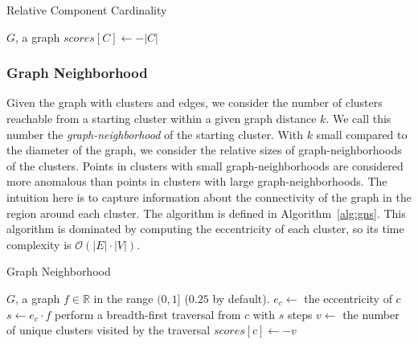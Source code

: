 \begin{algorithm}[h]
    \caption{Relative Component Cardinality}
    \label{alg:rcc}
\begin{algorithmic}[1]
    \REQUIRE $G$, a graph
        \STATE $scores[C] \gets -|C|$
    \ENDFOR
\end{algorithmic}
\end{algorithm}

\subsubsection{Graph Neighborhood}
Given the graph with clusters and edges, we consider the number of clusters reachable from a starting cluster within a given graph distance $k$.
We call this number the \textit{graph-neighborhood} of the starting cluster.
With $k$ small compared to the diameter of the graph, we consider the relative sizes of graph-neighborhoods of the clusters.
Points in clusters with small graph-neighborhoods are considered more anomalous than points in clusters with large graph-neighborhoods.
The intuition here is to capture information about the connectivity of the graph in the region around each cluster.
The algorithm is defined in Algorithm~\ref{alg:gns}.
This algorithm is dominated by computing the eccentricity of each cluster, so its time complexity is $\mathcal{O}(|E| \cdot |V|)$.

\begin{algorithm}[h]
    \caption{Graph Neighborhood}
    \label{alg:gns}
\begin{algorithmic}[1]
    \REQUIRE $G$, a graph
    \REQUIRE $f \in \mathbb{R}$ in the range $(0,1]$ ($0.25$ by default).
        \STATE $e_c \gets$ the eccentricity of $c$
        \STATE $s \gets e_c \cdot f$
        \STATE perform a breadth-first traversal from $c$ with $s$ steps
        \STATE $v \gets$ the number of unique clusters visited by the traversal
        \STATE $scores[c] \gets -v$
    \ENDFOR
\end{algorithmic}
\end{algorithm}

